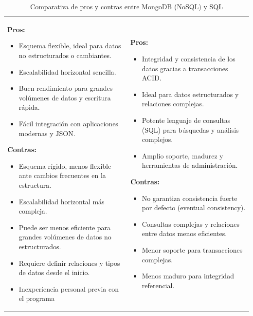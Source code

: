 \documentclass{article}
\begin{document}
\begin{enumerate}
\begin{table}[h!]
\begin{tabular}{p{7cm}|p{7cm}}
    \textbf{Pros:}
    \begin{itemize}
        \item Esquema flexible, ideal para datos no estructurados o cambiantes.
        \item Escalabilidad horizontal sencilla.
        \item Buen rendimiento para grandes volúmenes de datos y escritura rápida.
        \item Fácil integración con aplicaciones modernas y JSON.
    \end{itemize}
    \textbf{Contras:}
    \begin{itemize}
        \item Esquema rígido, menos flexible ante cambios frecuentes en la estructura.
        \item Escalabilidad horizontal más compleja.
        \item Puede ser menos eficiente para grandes volúmenes de datos no estructurados.
        \item Requiere definir relaciones y tipos de datos desde el inicio.
        \item Inexperiencia personal previa con el programa
    \end{itemize}
    &
    \vspace{0.025cm}
    \textbf{Pros:}
    \begin{itemize}
        \item Integridad y consistencia de los datos gracias a transacciones ACID.
        \item Ideal para datos estructurados y relaciones complejas.
        \item Potente lenguaje de consultas (SQL) para búsquedas y análisis complejos.
        \item Amplio soporte, madurez y herramientas de administración.
    \end{itemize}
    \textbf{Contras:}
    \begin{itemize}
        \item No garantiza consistencia fuerte por defecto (eventual consistency).
        \item Consultas complejas y relaciones entre datos menos eficientes.
        \item Menor soporte para transacciones complejas.
        \item Menos maduro para integridad referencial.
    \end{itemize}

    \\
    \end{tabular}
    \caption{Comparativa de pros y contras entre MongoDB (NoSQL) y SQL}
    \end{table}
    

\end{enumerate}
\end{document}
